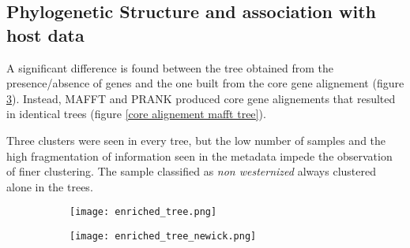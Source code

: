 \subsection*{Phylogenetic Structure and association with host data}
\graphicspath{{images/phylogeneticStructureHostData/}}



A significant difference is found between the tree obtained from the presence/absence of genes
and the one built from the core gene alignement (figure \ref{fig:phylogenetic trees}). Instead,
MAFFT and PRANK produced core gene alignements that resulted in identical trees (figure \ref{core alignement mafft tree}).

Three clusters were seen in every tree, but the low number of samples and the high fragmentation of
information seen in the metadata impede the observation of finer clustering. The sample 
classified as \emph{non westernized} always clustered alone in the trees.


\begin{figure}[h]
    \centering
    \begin{subfigure}[b]{0.8\textwidth}
        \centering
        \texttt{[image: enriched\_tree.png]}
        \caption{}
        \label{fig:core alignment prank tree}
    \end{subfigure}
    \begin{subfigure}[b]{0.8\textwidth}
        \centering
        \texttt{[image: enriched\_tree\_newick.png]}
        \caption{}
        \label{fig:presence absence tree}
    \end{subfigure}
       \caption{}
       \label{fig:phylogenetic trees}
\end{figure}



